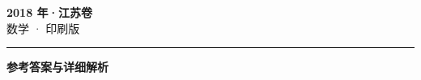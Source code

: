 \documentclass[zihao=5, a4paper]{ctexart}
\begin{document}
\begin{center}
  {\Large\bfseries 2018 年·江苏卷}\\[4pt]
  {\large 数学 · 印刷版}
\end{center}
\medskip
{}

\par\bigskip\hrule\bigskip
{}
\begin{center}{\large\bfseries 参考答案与详细解析}\end{center}
\smallskip

\end{document}
